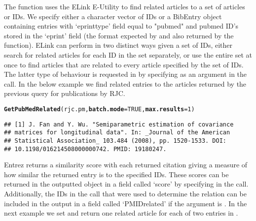 \documentclass[article]{jss}\usepackage[]{graphicx}\usepackage[]{color}
\makeatletter
\newcommand{\hlnum}[1]{\textcolor[rgb]{0.125,0.125,1}{#1}}%
\newcommand{\hlstd}[1]{\textcolor[rgb]{0.251,0.251,0.282}{#1}}%
\newcommand{\hlkwc}[1]{\textcolor[rgb]{0.529,0,0.184}{\textbf{#1}}}%
\newcommand{\hlkwd}[1]{\textcolor[rgb]{0.251,0.251,0.282}{\textbf{#1}}}%
\newenvironment{kframe}{%
 \def\at@end@of@kframe{}%
 \ifinner\ifhmode%
  \def\at@end@of@kframe{\end{minipage}}%
  \begin{minipage}{\columnwidth}%
 \fi\fi%
 \def\FrameCommand##1{\hskip\@totalleftmargin \hskip-\fboxsep
 \colorbox{shadecolor}{##1}\hskip-\fboxsep
     \hskip-\linewidth \hskip-\@totalleftmargin \hskip\columnwidth}%
 \MakeFramed {\advance\hsize-\width
   \@totalleftmargin\z@ \linewidth\hsize
   \@setminipage}}%
 {\par\unskip\endMakeFramed%
 \at@end@of@kframe}
\newenvironment{knitrout}{}{} %
\makeatother
\begin{document}
The  function uses the ELink E-Utility to find related articles to a set of articles or IDs.  We specify either a character vector of IDs or a BibEntry object containing entries with `eprinttype' field equal to "pubmed" and pubmed ID's stored in the `eprint' field (the format expected by \Biblatex{} and also returned by the  function).  ELink can perform in two distinct ways given a set of IDs, either search for related articles for each ID in the set separately, or use the entire set at once to find articles that are related to every article specified by the set of IDs.  The latter type of behaviour is requested in  by specifying  as an argument in the call.  In the below example we find related entries to the articles returned by the previous query for publications by RJC.
\begin{knitrout}
\color{fgcolor}\begin{kframe}
\begin{alltt}
\hlkwd{GetPubMedRelated}\hlstd{(rjc.pm,} \hlkwc{batch.mode} \hlstd{=} \hlnum{TRUE}\hlstd{,} \hlkwc{max.results} \hlstd{=} \hlnum{1}\hlstd{)}
\end{alltt}
\begin{verbatim}
## [1] J. Fan and Y. Wu. "Semiparametric estimation of covariance
## matrices for longitudinal data". In: _Journal of the American
## Statistical Association_ 103.484 (2008), pp. 1520-1533. DOI:
## 10.1198/016214508000000742. PMID: 19180247.
\end{verbatim}
\end{kframe}
\end{knitrout}


Entrez returns a similarity score with each returned citation giving a measure of how similar the returned entry is to the specified IDs.  These scores can be returned in the outputted  object in a field called `score' by specifying  in the call.  Additionally, the IDs in the call that were used to determine the relation can be included in the output in a field called `PMIDrelated' if the argument  is .  In the next example we set  and return one related article for each of two entries in .
\end{document}
